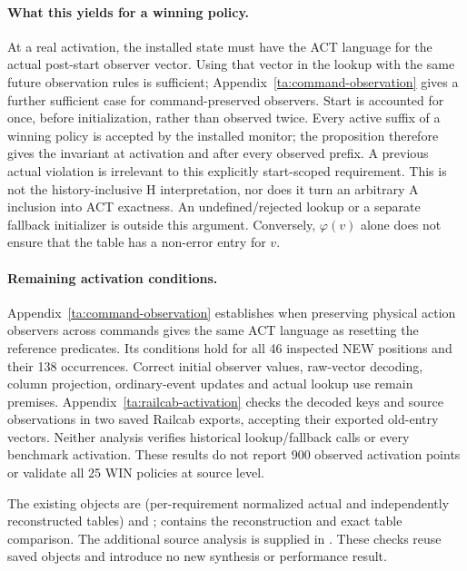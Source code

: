 \paragraph{What this yields for a winning policy.}
At a real activation, the installed state must have the ACT language for the actual post-start observer vector. Using that vector in the lookup with the same future observation rules is sufficient; Appendix~\ref{ta:command-observation} gives a further sufficient case for command-preserved observers. Start is accounted for once, before initialization, rather than observed twice. Every active suffix of a winning policy is accepted by the installed monitor; the proposition therefore gives the invariant at activation and after every observed prefix. A previous actual violation is irrelevant to this explicitly start-scoped requirement. This is not the history-inclusive H interpretation, nor does it turn an arbitrary A inclusion into ACT exactness. An undefined/rejected lookup or a separate fallback initializer is outside this argument. Conversely, $\varphi(v)$ alone does not ensure that the table has a non-error entry for $v$.

\paragraph{Remaining activation conditions.}
Appendix~\ref{ta:command-observation} establishes when preserving physical action observers across commands gives the same ACT language as resetting the reference predicates. Its conditions hold for all 46 inspected NEW positions and their 138 occurrences. Correct initial observer values, raw-vector decoding, column projection, ordinary-event updates and actual lookup use remain premises. Appendix~\ref{ta:railcab-activation} checks the decoded keys and source observations in two saved Railcab exports, accepting their exported old-entry vectors. Neither analysis verifies historical lookup/fallback calls or every benchmark activation. These results do not report 900 observed activation points or validate all 25 WIN policies at source level.

The existing objects are  (per-requirement normalized actual and independently reconstructed tables) and ;  contains the reconstruction and exact table comparison. The additional source analysis is supplied in . These checks reuse saved objects and introduce no new synthesis or performance result.
